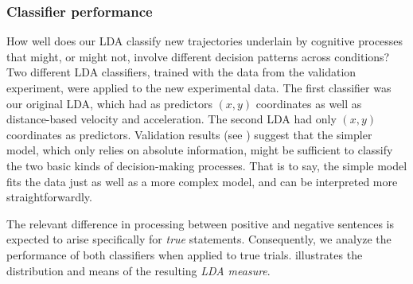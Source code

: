 \documentclass[11pt]{article}
\begin{document}

\subsubsection{Classifier performance}
How well does our LDA classify new trajectories underlain by cognitive processes that might, or might not, involve different decision patterns across conditions?
Two different LDA classifiers, trained with the data from the validation experiment, were applied to the new experimental data. The first classifier was our original LDA, which had as predictors $(x,y)$ coordinates as well as distance-based velocity and acceleration. The second LDA had only $(x,y)$ coordinates as predictors. Validation results (see ) suggest that the simpler model, which only relies on absolute information, might be sufficient to classify the two basic kinds of decision-making processes. That is to say, the simple model fits
the data just as well as a more complex model, and can be interpreted more straightforwardly. 

The relevant difference in processing between positive and negative sentences is expected to arise specifically for \emph{true} statements. Consequently, we analyze the performance of both classifiers when applied to true trials.  illustrates the distribution and means of the resulting \textit{LDA measure}. 
\end{document}

